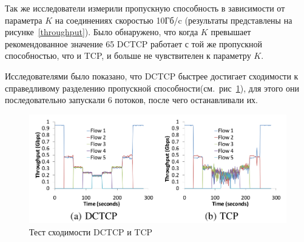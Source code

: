 \documentclass[14pt, a4paper,oneside]{extarticle}
\begin{document}
Так же исследователи измерили пропускную способность в зависимости от параметра $K$ на соединениях скоростью 10Гб/c (результаты представлены на рисунке~\ref{throughput}). Было обнаружено, что когда $K$ превышает рекомендованное значение 65 DCTCP работает с той же пропускной способностью, что и TCP, и больше не чувствителен к параметру $K$.
\begin{figure}
\begin{floatrow}

\end{floatrow}
\end{figure}

Исследователями было показано, что DCTCP быстрее достигает сходимости к справедливому разделению пропускной способности(см.~рис~\ref{fair_share}), для этого они последовательно запускали 6 потоков, после чего останавливали их.
\begin{figure}
	\includegraphics[width=0.7\linewidth]{fair_share}
	\caption{Тест сходимости DCTCP и TCP}
	\label{fair_share}
\end{figure}
\end{document}

